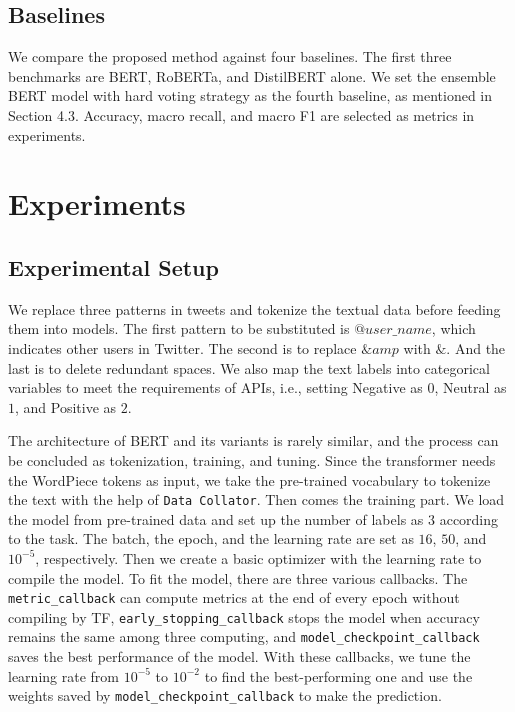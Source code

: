 \documentclass[runningheads]{llncs}
\begin{document}
\subsection{Baselines}
We compare the proposed method against four baselines. The first three benchmarks are BERT, RoBERTa, and DistilBERT alone. We set the ensemble BERT model with hard voting strategy as the fourth baseline, as mentioned in Section 4.3. Accuracy, macro recall, and macro F1 are selected as metrics in experiments.

\section{Experiments}
\subsection{Experimental Setup}
We replace three patterns in tweets and tokenize the textual data before feeding them into models. The first pattern to be substituted is $@user\_name$, which indicates other users in Twitter. The second is to replace $\&amp$ with $\&$. And the last is to delete redundant spaces. We also map the text labels into categorical variables to meet the requirements of APIs, i.e., setting Negative as $0$, Neutral as $1$, and Positive as $2$.


The architecture of BERT and its variants is rarely similar, and the process can be concluded as tokenization, training, and tuning. Since the transformer needs the WordPiece tokens as input, we take the pre-trained vocabulary to tokenize the text with the help of \texttt{Data Collator}. Then comes the training part. We load the model from pre-trained data and set up the number of labels as $3$ according to the task. The batch, the epoch, and the learning rate are set as $16$, $50$, and $10^{-5}$, respectively. Then we create a basic optimizer with the learning rate to compile the model. To fit the model, there are three various callbacks. The \texttt{metric\_callback} can compute metrics at the end of every epoch without compiling by TF,  \texttt{early\_stopping\_callback} stops the model when accuracy remains the same among three computing, and \texttt{model\_checkpoint\_callback} saves the best performance of the model. With these callbacks, we tune the learning rate from $10^{-5}$ to $10^{-2}$ to find the best-performing one and use the weights saved by \texttt{model\_checkpoint\_callback} to make the prediction.
\end{document}
